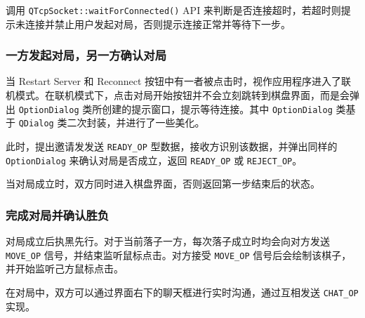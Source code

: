 \documentclass{noithesis}
\begin{document}
	调用 \verb|QTcpSocket::waitForConnected()| API 来判断是否连接超时，若超时则提示未连接并禁止用户发起对局，否则提示连接正常并等待下一步。
	
	\subsubsection{一方发起对局，另一方确认对局}
	
	当 Restart Server 和 Reconnect 按钮中有一者被点击时，视作应用程序进入了联机模式。在联机模式下，点击对局开始按钮并不会立刻跳转到棋盘界面，而是会弹出 \verb|OptionDialog| 类所创建的提示窗口，提示等待连接。其中 \verb|OptionDialog| 类基于 \verb|QDialog| 类二次封装，并进行了一些美化。
	
	此时，提出邀请发发送 \verb|READY_OP| 型数据，接收方识别该数据，并弹出同样的 \verb|OptionDialog| 来确认对局是否成立，返回 \verb|READY_OP| 或 \verb|REJECT_OP|。
	
	当对局成立时，双方同时进入棋盘界面，否则返回第一步结束后的状态。 

    \subsubsection{完成对局并确认胜负}
    
    对局成立后执黑先行。对于当前落子一方，每次落子成立时均会向对方发送 \verb|MOVE_OP| 信号，并结束监听鼠标点击。对方接受 \verb|MOVE_OP| 信号后会绘制该棋子，并开始监听己方鼠标点击。
    
    在对局中，双方可以通过界面右下的聊天框进行实时沟通，通过互相发送 \verb|CHAT_OP| 实现。
    
\end{document}
